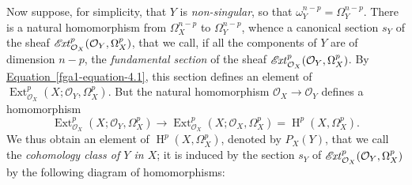   Now suppose, for simplicity, that \(Y\) is \emph{non-singular}, so that \(\omega _Y^{n-p}=\Omega _Y^{n-p}\).
  There is a natural homomorphism from \(\Omega _X^{n-p}\) to \(\Omega _Y^{n-p}\), whence a canonical section \(s_Y\) of the sheaf \(\mathscr {E}\kern  -1.5pt\mathit {xt}_{\mathcal {O}_X}^p(\mathcal {O}_Y,\Omega _X^p)\), that we call, if all the components of \(Y\) are of dimension \(n-p\), the \emph{fundamental section} of the sheaf \(\mathscr {E}\kern  -1.5pt\mathit {xt}_{\mathcal {O}_X}^p(\mathcal {O}_Y,\Omega _X^p)\).
  By \hyperref[fga1-equation-4.1]{Equation~\ref*{fga1-equation-4.1}}, this section defines an element of \(\operatorname {Ext}_{\mathcal {O}_X}^p(X;\mathcal {O}_Y,\Omega _X^p)\).
  But the natural homomorphism \(\mathcal {O}_X\to \mathcal {O}_Y\) defines a homomorphism
  \[     \operatorname {Ext}_{\mathcal {O}_X}^p(X;\mathcal {O}_Y,\Omega _X^p)     \to  \operatorname {Ext}_{\mathcal {O}_X}^p(X;\mathcal {O}_X,\Omega _X^p)     = \operatorname {H}^p(X,\Omega _X^p).   \]
  We thus obtain an element of \(\operatorname {H}^p(X,\Omega _X^p)\), denoted by \(P_X(Y)\), that we call the \emph{cohomology class of \(Y\) in \(X\)};
  it is induced by the section \(s_Y\) of \(\mathscr {E}\kern  -1.5pt\mathit {xt}_{\mathcal {O}_X}^p(\mathcal {O}_Y,\Omega _X^p)\) by the following diagram of homomorphisms:

